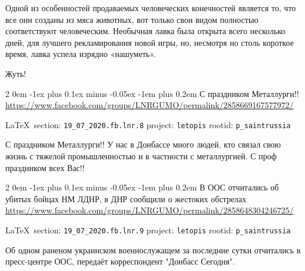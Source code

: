 \documentclass[a4paper,11pt]{extreport}
\makeatletter
\renewcommand\subsection{%
  \clearpage
    \@startsection{subsection}%
    {2}%
    {0em}%
    {-1ex plus 0.1ex minus -0.05ex}%
    {-1em plus 0.2em}%
    {\scshape\bfseries\Large}%
}
\makeatother
\begin{document}
Одной из особенностей продаваемых человеческих конечностей является то, что все
они созданы из мяса животных, вот только свои видом полностью соответствуют
человеческим. Необычная лавка была открыта всего несколько дней, для лучшего
рекламирования новой игры, но, несмотря но столь короткое время, лавка успела
изрядно «нашуметь».

Жуть!
 
 
\subsection{С праздником Металлурги!!}
\label{sec:19_07_2020.fb.lnr.8}
\url{https://www.facebook.com/groups/LNRGUMO/permalink/2858669167577972/}
  
\vspace{0.5cm}
{\small\LaTeX~section: \verb|19_07_2020.fb.lnr.8| project: \verb|letopis| rootid: \verb|p_saintrussia|}
\vspace{0.5cm}

С праздником Металлурги!! У нас в Донбассе много людей, кто связал свою жизнь
с тяжелой промышленностью и в частности с металлургией. С проф праздником всех
Вас!!  

 
 

\subsection{В ООС отчитались об убитых бойцах НМ ЛДНР, в ДНР сообщили о жестоких обстрелах}
\label{sec:19_07_2020.fb.lnr.9}
\url{https://www.facebook.com/groups/LNRGUMO/permalink/2858648304246725/}
  
\vspace{0.5cm}
{\small\LaTeX~section: \verb|19_07_2020.fb.lnr.9| project: \verb|letopis| rootid: \verb|p_saintrussia|}
\vspace{0.5cm}

Об одном раненом украинском военнослужащем за последние сутки отчитались в
пресс-центре ООС, передаёт корреспондент "Донбасс Сегодня".
\end{document}
